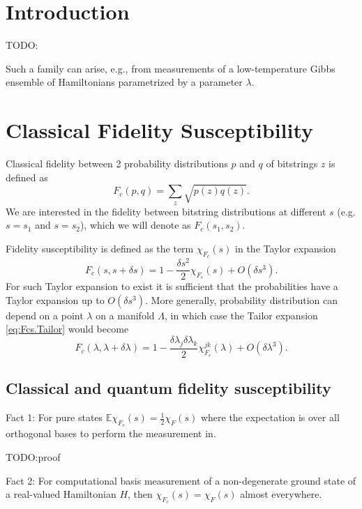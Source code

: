 \documentclass[american,aps,pra,reprint,floatfix,nofootinbib,superscriptaddress]{revtex4-2}
\begin{document}
\section{Introduction}
TODO:

Such a family can arise, e.g., from measurements of a low-temperature
Gibbs ensemble of Hamiltonians parametrized by a parameter $\lambda$.

\section{Classical Fidelity Susceptibility}
Classical fidelity between 2 probability distributions $p$ and $q$ of
bitstrings $z$ is defined as
\begin{equation}
  F_c(p, q) = \sum_{z} \sqrt{p(z) q(z)}.
\end{equation}
We are interested in the fidelity between bitstring distributions at different
$s$ (e.g. $s=s_1$ and $s=s_2$), which we will denote as $F_c(s_1, s_2)$.

Fidelity susceptibility is defined as the term $\chi_{F_c}(s)$ in the Taylor
expansion
\begin{equation}
\label{eq:Fcs.Tailor}
  F_c(s, s+\delta s) = 1 - \frac{\delta s^2}{2} \chi_{F_c}(s) + O(\delta s^3).
\end{equation}
For such Taylor expansion to exist it is sufficient that the probabilities have
a Taylor expansion up to $O(\delta s^3)$. More generally, probability
distribution can depend on a point $\lambda$ on a manifold $\Lambda$,
in which case the Tailor expansion \eqref{eq:Fcs.Tailor} would become
\begin{equation}
\label{eq:Fcl.Tailor}
  F_c(\lambda, \lambda+\delta \lambda) = 1 - \frac{\delta \lambda_{j} \delta \lambda_k}{2} \chi_{F_c}^{jk}(\lambda) + O(\delta \lambda^3).
\end{equation}

\subsection{Classical and quantum fidelity susceptibility}
Fact 1: For pure states $\mathbb{E}\chi_{F_c} (s) = \frac12 \chi_F (s)$
where the expectation is over all orthogonal bases to perform the measurement in.

TODO:proof

Fact 2: For computational basis measurement of a non-degenerate ground state
of a real-valued Hamiltonian $H$, then $\chi_{F_c}(s) = \chi_F(s)$
almost everywhere.
\end{document}
